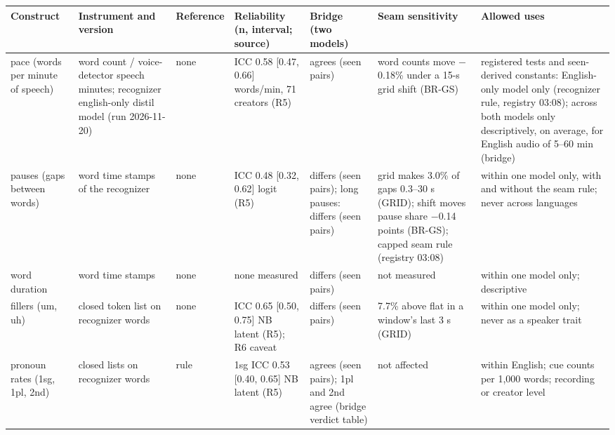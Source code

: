 {\scriptsize\setlength{\tabcolsep}{2pt}
\begin{tabular}{@{}p{}p{}p{}p{}p{}p{}p{}@{}}
\toprule
Construct & Instrument and version & Reference & Reliability (n, interval; source) & Bridge (two models) & Seam sensitivity & Allowed uses \\
\midrule
pace (words per minute of speech) & word count / voice-detector speech minutes; recognizer english-only distil model (run 2026-11-20) & none & ICC 0.58 [0.47, 0.66] words/min, 71 creators (R5) & agrees (seen pairs) & word counts move \ensuremath{-}0.18\% under a 15-s grid shift (BR-GS) & registered tests and seen-derived constants: English-only model only (recognizer rule, registry 03:08); across both models only descriptively, on average, for English audio of 5--60 min (bridge) \\
pauses (gaps between words) & word time stamps of the recognizer & none & ICC 0.48 [0.32, 0.62] logit (R5) & differs (seen pairs); long pauses: differs (seen pairs) & grid makes 3.0\% of gaps 0.3--30 s (GRID); shift moves pause share \ensuremath{-}0.14 points (BR-GS); capped seam rule (registry 03:08) & within one model only, with and without the seam rule; never across languages \\
word duration & word time stamps & none & none measured & differs (seen pairs) & not measured & within one model only; descriptive \\
fillers (um, uh) & closed token list on recognizer words & none & ICC 0.65 [0.50, 0.75] NB latent (R5); R6 caveat & differs (seen pairs) & 7.7\% above flat in a window's last 3 s (GRID) & within one model only; never as a speaker trait \\
pronoun rates (1sg, 1pl, 2nd) & closed lists on recognizer words & rule & 1sg ICC 0.53 [0.40, 0.65] NB latent (R5) & agrees (seen pairs); 1pl and 2nd agree (bridge verdict table) & not affected & within English; cue counts per 1,000 words; recording or creator level \\

\end{tabular}}
